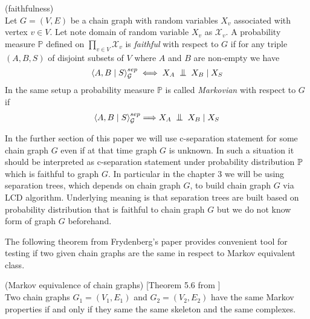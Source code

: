 \begin{defi} \label{faithDef} (faithfulness) \\
	Let $G = (V, E)$ be a chain graph with random variables $X_v$ associated with vertex $v \in V$. Let note domain of 
	random variable $X_v$ as $\mathcal{X}_v$. A probability measure $\mathbb{P}$ 
	defined on $\prod_{v \in V} \mathcal{X}_v$ is \textit{faithful} with respect to $G$ if 
	for any triple $(A, B, S)$ of disjoint subsets of $V$ where $A$ and $B$ are non-empty we have
	\begin{equation}
		\cSep{A}{B}{S}{G} \iff X_A \bigCI X_B \mid X_S
	\end{equation}
	In the same setup a probability measure $\mathbb{P}$ is called \textit{Markovian} with respect to $G$ if
	\begin{equation}
		\cSep{A}{B}{S}{G} \Longrightarrow X_A \bigCI X_B \mid X_S
	\end{equation}
\end{defi}

\begin{remark}
	\normalfont
	In the further section of this paper we will use c-separation statement for some chain graph $G$ even if
	at that time graph $G$ is unknown. In such a situation it should be interpreted as c-separation statement under 
	probability distribution $\mathbb{P}$ which is faithful to graph $G$. In particular in the chapter 3
	we will be using separation trees, which depends on chain graph $G$, to build chain graph $G$ via LCD algorithm.
	Underlying meaning is that separation trees are built based on probability distribution that is faithful to 
	chain graph $G$ but we do not know form of graph $G$ beforehand. 
\end{remark}


The following theorem from Frydenberg's paper \cite{CGMP} provides convenient tool for testing if two given 
chain graphs are the same in respect to Markov equivalent class.

\begin{prop} \label{markovEquivThm} (Markov equivalence of chain graphs) [Theorem 5.6 from \cite{CGMP}] \\
	Two chain graphs $G_1 = (V_1, E_1)$ and $G_2 = (V_2, E_2)$ have the same Markov properties if and only if they same 
	the same skeleton and the same complexes.
\end{prop}	




